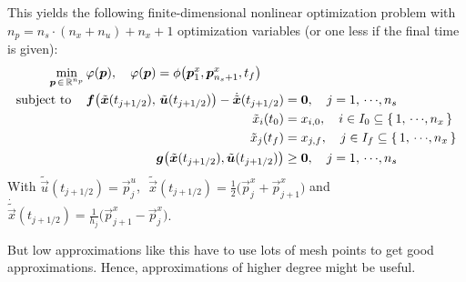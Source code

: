 				This yields the following finite-dimensional nonlinear optimization problem with \( n_p = n_s \cdot (n_x + n_u) + n_x + 1 \) optimization variables (or one less if the final time is given):
				\begin{align*}
					\min_{\bm{p} \,\in\, \mathbb{R}^{n_p}} & \, \varphi(\bm{p}),\quad \varphi(\bm{p}) = \phi\big(\bm{p}_1^x, \bm{p}_{n_s + 1}^x, t_f\big) \\
					\mathrm{subject~to}\quad        & \,
					\begin{alignedat}[t]{2}
						\bm{f}\big( \tilde{\bm{x}}(t_{j + 1/2}),\, \tilde{\bm{u}}(t_{j + 1/2}) \big) - \dot{\tilde{\bm{x}}}(t_{j + 1/2}) &= \bm{0},\quad j = 1,\,\cdots\!,n_s \\
						\tilde{x}_i(t_0) &= x_{i, 0},\quad i \in I_0 \subseteq \{\, 1,\,\cdots\!,n_x \,\} \\
						\tilde{x}_j(t_f) &= x_{j, f},\quad j \in I_f \subseteq \{\, 1,\,\cdots\!,n_x \,\} \\
						\bm{g}\big( \tilde{\bm{x}}(t_{j + 1/2}), \tilde{\bm{u}}(t_{j + 1/2}) \big) &\geq \bm{0},\quad j = 1,\,\cdots\!,n_s
					\end{alignedat}
				\end{align*}
				With \( \tilde{\vec{u}}(t_{j + 1/2}) = \vec{p}_j^u \),\,\, \( \tilde{\vec{x}}(t_{j + 1/2}) = \frac{1}{2} \big( \vec{p}_j^x + \vec{p}_{j + 1}^x \big) \) and \( \dot{\tilde{\vec{x}}}(t_{j + 1/2}) = \frac{1}{h_j} \big( \vec{p}_{j + 1}^x - \vec{p}_j^x \big) \).

				But low approximations like this have to use lots of mesh points to get good approximations. Hence, approximations of higher degree might be useful.

